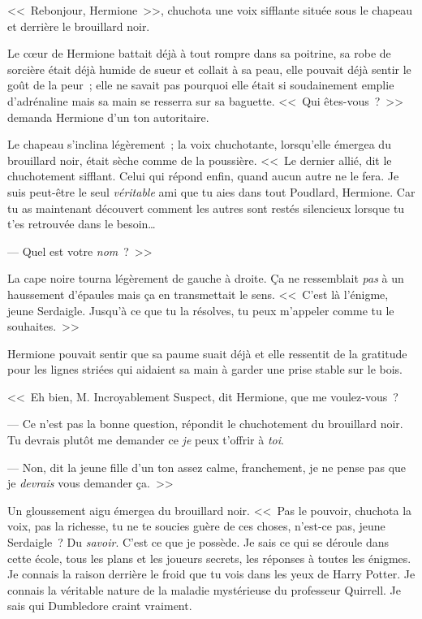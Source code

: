 <<~Rebonjour, Hermione~>>, chuchota une voix sifflante située sous le chapeau et derrière le brouillard noir.

Le cœur de Hermione battait déjà à tout rompre dans sa poitrine, sa robe de sorcière était déjà humide de sueur et collait à sa peau, elle pouvait déjà sentir le goût de la peur~; elle ne savait pas pourquoi elle était si soudainement emplie d'adrénaline mais sa main se resserra sur sa baguette. <<~Qui êtes-vous~?~>> demanda Hermione d'un ton autoritaire.

Le chapeau s'inclina légèrement~; la voix chuchotante, lorsqu'elle émergea du brouillard noir, était sèche comme de la poussière. <<~Le dernier allié, dit le chuchotement sifflant. Celui qui répond enfin, quand aucun autre ne le fera. Je suis peut-être le seul \emph{véritable} ami que tu aies dans tout Poudlard, Hermione. Car tu as maintenant découvert comment les autres sont restés silencieux lorsque tu t'es retrouvée dans le besoin…

--- Quel est votre \emph{nom}~?~>>

La cape noire tourna légèrement de gauche à droite. Ça ne ressemblait \emph{pas} à un haussement d'épaules mais ça en transmettait le sens. <<~C'est là l'énigme, jeune Serdaigle. Jusqu'à ce que tu la résolves, tu peux m'appeler comme tu le souhaites.~>>

Hermione pouvait sentir que sa paume suait déjà et elle ressentit de la gratitude pour les lignes striées qui aidaient sa main à garder une prise stable sur le bois.

<<~Eh bien, M. Incroyablement Suspect, dit Hermione, que me voulez-vous~?

--- Ce n'est pas la bonne question, répondit le chuchotement du brouillard noir. Tu devrais plutôt me demander ce \emph{je} peux t'offrir à \emph{toi}.

--- Non, dit la jeune fille d'un ton assez calme, franchement, je ne pense pas que je \emph{devrais} vous demander ça.~>>

Un gloussement aigu émergea du brouillard noir. <<~Pas le pouvoir, chuchota la voix, pas la richesse, tu ne te soucies guère de ces choses, n'est-ce pas, jeune Serdaigle~? Du \emph{savoir}. C'est ce que je possède. Je sais ce qui se déroule dans cette école, tous les plans et les joueurs secrets, les réponses à toutes les énigmes. Je connais la raison derrière le froid que tu vois dans les yeux de Harry Potter. Je connais la véritable nature de la maladie mystérieuse du professeur Quirrell. Je sais qui Dumbledore craint vraiment.

